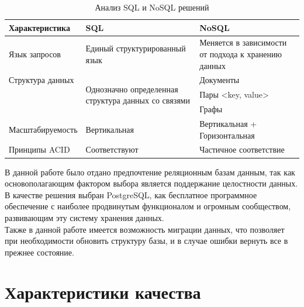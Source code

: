\documentclass[a4paper,14pt]{extreport} %
\begin{document}
\begin{table}[H]
\begin{center}
\begin{tabular}{ |p{4.2cm}|p{6cm}|p{5cm}|  }
	\hline
 	\textbf{Характеристика} & \textbf{SQL} & \textbf{NoSQL}\\
 	\hline
 	Язык запросов    & Единый структурированный язык & Меняется в зависимости от подхода к хранению данных \\
 	\hline
 	Структура данных & \multirow{3}{6cm}{Однозначно определенная структура данных со связями} & Документы \\ \cline{3-3}
	& & Пары <key, value> \\ \cline{3-3}
	& & Графы \\\cline{3-3}
	\hline
	Масштабируемость & Вертикальная &  Вертикальная + Горизонтальная \\
	\hline
	Принципы ACID & Соответствуют & Частичное соответствие \\
 	\hline
\end{tabular}
\end{center}
\caption {Анализ SQL и NoSQL решений}
\label{tab:databases}
\end{table}

\newpage
В данной работе было отдано предпочтение реляционным базам данным, так как основополагающим фактором выбора является поддержание целостности данных. В качестве решения выбран PostgreSQL, как бесплатное программное обеспечение с наиболее продвинутым функционалом и огромным сообществом, развивающим эту систему хранения данных. \\

Также в данной работе имеется возможность миграции данных, что позволяет при необходимости обновить структуру базы, и в случае ошибки вернуть все в прежнее состояние.

\newpage
\section{Характеристики качества}
\end{document}
